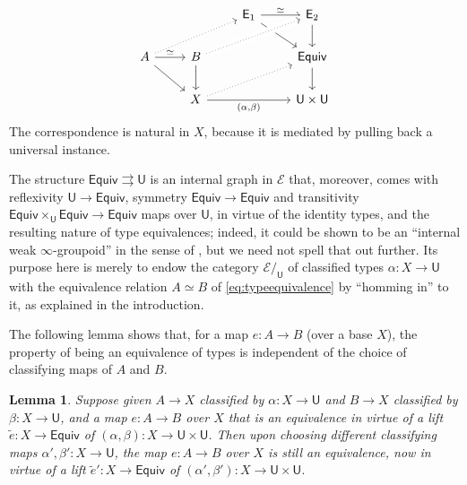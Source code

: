 \documentclass[12pt,reqno]{amsart}
\newcommand{\EE}{\ensuremath{\mathcal{E}}}
\renewcommand{\to}{\ensuremath{\rightarrow}}
\newcommand{\tto}{\ensuremath{\rightrightarrows}}
\newcommand{\T}{\ensuremath{\mathsf{U}}}
\newtheorem{lemma}[theorem]{Lemma}
\theoremstyle{remark}
\theoremstyle{definition}
\begin{document}
\begin{equation}\label{diag:univalence3}
\begin{tikzcd} 
	&& \mathsf{E}_1 \ar[rd]  \ar[r,"{\simeq}"]  & \mathsf{E}_2 \ar[d] \\  
A \ar[rd] \ar[r, "{\simeq}"] \ar[rru, dotted] & B \ar[d] \ar[rru, crossing over, dotted] && \mathsf{Equiv} \ar[d] \\  
& X \ar[rru, dotted] \ar[rr, swap, "{(\alpha, \beta)}"] && \T \times \T
	 \end{tikzcd}
 \end{equation}
The correspondence is natural in $X$, because it is mediated by pulling back a universal instance.  

The structure $\mathsf{Equiv} \tto \T $ is an internal graph in $\EE$ that, moreover, comes with reflexivity $\T \to \mathsf{Equiv}$, symmetry $\mathsf{Equiv} \to \mathsf{Equiv}$ and transitivity $\mathsf{Equiv}\times_\T \mathsf{Equiv} \to \mathsf{Equiv}$ maps over $\T$, in virtue of the identity types, and the resulting nature of type equivalences; indeed, it could be shown to be an ``internal weak $\infty$-groupoid'' in the sense of \cite{Lumsdaine:groupoids}, but we need not spell that out further.  Its purpose here is merely to endow the category $\EE/_\T$ of classified types $\alpha : X \to \T$ with the equivalence relation $A\simeq B$ of \eqref{eq:typeequivalence} by ``homming in'' to it, as explained in the introduction.  

The following lemma shows that, for a map $e : A \to B$ (over a base $X$), the property of being an equivalence of types is independent of the choice of classifying maps of $A$ and $B$.
\begin{lemma}\label{lemma:equivinvariance}
Suppose given $A\to X$ classified by $\alpha: X \to \T$ and $B \to X$ classified by $\beta: X \to \T$, and a map $e : A \to B$ over $X$ that is an equivalence in virtue of a lift $\tilde{e} : X \to  \mathsf{Equiv}$ of $(\alpha, \beta) : X \to \T\times \T$.   Then upon choosing different classifying maps $\alpha', \beta' : X \to \T$, the map $e : A \to B$ over $X$ is still an equivalence, now in virtue of a lift ${\tilde{e}}' : X \to \mathsf{Equiv}$ of $(\alpha', \beta') : X \to \T\times \T$.
\end{lemma}
\end{document}
